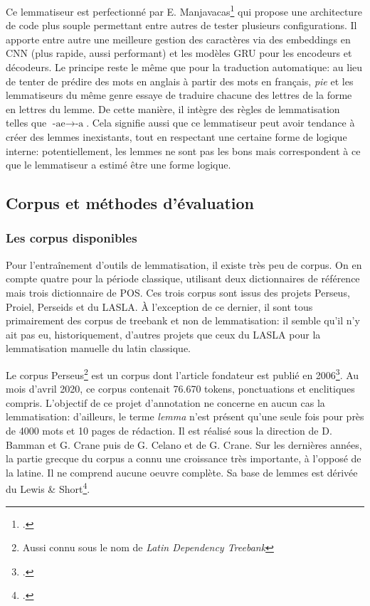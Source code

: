 Ce lemmatiseur est perfectionné par E. Manjavacas\footcite{manjavacas_improving_2019} qui propose une architecture de code plus souple permettant entre autres de tester plusieurs configurations. Il apporte entre autre une meilleure gestion des caractères via des embeddings en CNN (plus rapide, aussi performant) et les modèles GRU pour les encodeurs et décodeurs. Le principe reste le même que pour la traduction automatique: au lieu de tenter de prédire des mots en anglais à partir des mots en français, \textit{pie} et les lemmatiseurs du même genre essaye de traduire chacune des lettres de la forme en lettres du lemme. De cette manière, il intègre des règles de lemmatisation telles que $\textrm{-ae} \rightarrow \textrm{-a}$. Cela signifie aussi que ce lemmatiseur peut avoir tendance à créer des lemmes inexistants, tout en respectant une certaine forme de logique interne: potentiellement, les lemmes ne sont pas les bons mais correspondent à ce que le lemmatiseur a estimé être une forme logique. %

\subsection{Corpus et méthodes d'évaluation}
\label{subsec:lemma_corpus}

\subsubsection{Les corpus disponibles}

Pour l'entraînement d'outils de lemmatisation, il existe très peu de corpus. On en compte quatre pour la période classique, utilisant deux dictionnaires de référence mais trois dictionnaire de POS. Ces trois corpus sont issus des projets Perseus, Proiel, Perseids et du LASLA. À l'exception de ce dernier, il sont tous primairement des corpus de treebank et non de lemmatisation: il semble qu'il n'y ait pas eu, historiquement, d'autres projets que ceux du LASLA pour la lemmatisation manuelle du latin classique.

Le corpus Perseus\footnote{Aussi connu sous le nom de \textit{Latin Dependency Treebank}} est un corpus dont l'article fondateur est publié en 2006\footcite{bamman_design_2006}. Au mois d'avril 2020, ce corpus contenait 76.670 tokens, ponctuations et enclitiques compris. L'objectif de ce projet d'annotation ne concerne en aucun cas la lemmatisation: d'ailleurs, le terme \textit{lemma} n'est présent qu'une seule fois pour près de 4000 mots et 10 pages de rédaction. Il est réalisé sous la direction de D. Bamman et G. Crane puis de G. Celano et de G. Crane. Sur les dernières années, la partie grecque du corpus a connu une croissance très importante, à l'opposé de la latine. Il ne comprend aucune oeuvre complète. Sa base de lemmes est dérivée du Lewis \& Short\footcite{shorts_latin_1958}.

